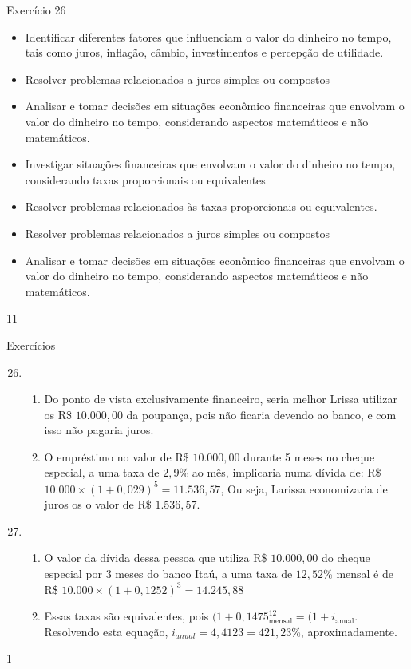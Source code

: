 \begin{objectives}{Exercício 26}
{
  \begin{itemize}
  \item  Identificar diferentes fatores que influenciam o valor do dinheiro no tempo, tais como juros, inflação, câmbio, investimentos e percepção de utilidade.
  \item Resolver problemas relacionados a juros simples ou compostos
  \item Analisar e tomar decisões em situações econômico financeiras que envolvam o valor do dinheiro no tempo, considerando aspectos matemáticos e não matemáticos.
  \end{itemize}

  \begin{itemize}
  \item Investigar situações financeiras que envolvam o valor do dinheiro no tempo, considerando taxas proporcionais ou equivalentes
  \item Resolver problemas relacionados às taxas proporcionais ou equivalentes.
  \item Resolver problemas relacionados a juros simples ou compostos
  \item Analisar e tomar decisões em situações econômico financeiras que envolvam o valor do dinheiro no tempo, considerando aspectos matemáticos e não matemáticos.
  \end{itemize}
}{1}{1}
\end{objectives}

\begin{answer}{Exercícios}
{\exerciselist

  \begin{enumerate}\setcounter{enumi}{25}
    \item 
    \begin{enumerate}
      \item Do ponto de vista exclusivamente financeiro, seria melhor Lrissa utilizar os R\$ $10.000{,}00$ da poupança, pois não ficaria devendo ao banco, e com isso não pagaria juros.

      \item O empréstimo no valor de R\$ $10.000{,}00$ durante 5 meses no cheque especial, a uma taxa de $2{,}9$\% ao mês, implicaria numa dívida de: R\$ $10.000\times(1+0{,}029)^5=11.536{,}57$, Ou seja, Larissa economizaria de juros os o valor de R\$ $1.536{,}57$.
    \end{enumerate}
    \item
    \begin{enumerate}
      \item O valor da dívida dessa pessoa que utiliza R\$ $10.000{,}00$ do cheque especial por 3 meses do banco Itaú, a uma taxa de $12{,}52$\% mensal é de R\$ $10.000\times (1+0{,}1252)^3=14.245{,}88$
      \item Essas taxas são equivalentes, pois $(1+0{,}1475_{\text{mensal}}^{12}=(1+i_{\text{anual}}$. Resolvendo esta equação, $i_{anual}=4{,}4123=421{,}23$\%, aproximadamente.
    \end{enumerate}
    

  \end{enumerate}
}{1}
\end{answer}
\clearmargin

